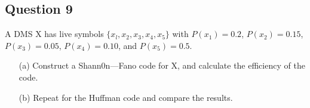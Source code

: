 \subsection*{Question 9}
A DMS X has live symbols $\{x_l,x_2,x_3,x_4,x_5\}$ with $P(x_1) = 0.2$, $P(x_2)=0.15$, $P(x_3) =0.05$,
$P(x_4) = 0.10$, and $P(x_5) = 0.5$. 
\begin{itemize}
\item[(a)] Construct a Shann0n—Fano code for X, and calculate the efficiency of the code.
\item[(b)] Repeat for the Huffman code and compare the results.
\end{itemize}

 

\item
